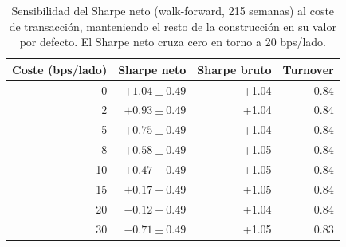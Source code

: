 \begin{table}[htbp]
\centering
\caption{Sensibilidad del Sharpe neto (walk-forward, 215 semanas) al coste de transacci\'on, manteniendo el resto de la construcci\'on en su valor por defecto. El Sharpe neto cruza cero en torno a 20 bps/lado.}
\label{tab:construction-cost}
\small
\begin{tabular}{rrrr}
\toprule
Coste (bps/lado) & Sharpe neto & Sharpe bruto & Turnover \\
\midrule
0 & $+1.04 \pm 0.49$ & +1.04 & 0.84 \\
2 & $+0.93 \pm 0.49$ & +1.04 & 0.84 \\
5 & $+0.75 \pm 0.49$ & +1.04 & 0.84 \\
8 & $+0.58 \pm 0.49$ & +1.05 & 0.84 \\
10 & $+0.47 \pm 0.49$ & +1.05 & 0.84 \\
15 & $+0.17 \pm 0.49$ & +1.05 & 0.84 \\
20 & $-0.12 \pm 0.49$ & +1.04 & 0.84 \\
30 & $-0.71 \pm 0.49$ & +1.05 & 0.83 \\
\bottomrule
\end{tabular}
\end{table}
